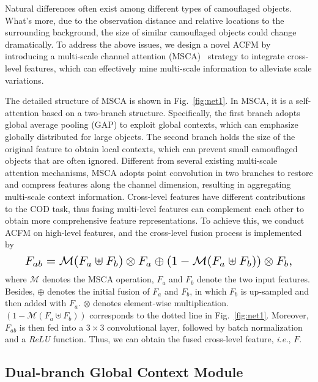 \documentclass[lettersize,journal]{IEEEtran}
\def\ie{\emph{i.e.}}
\begin{document}
Natural differences often exist among different types of camouflaged objects. What's more, due to the observation distance and relative locations to the surrounding background, the size of similar camouflaged objects could change dramatically. To address the above issues, we design a novel ACFM by introducing a multi-scale channel attention (MSCA)~\cite{aff} strategy to integrate cross-level features, which can effectively mine multi-scale information to alleviate scale variations.

The detailed structure of MSCA is shown in Fig.~\ref{fig:net1}. In MSCA, it is a self-attention based on a two-branch structure. Specifically, the first branch adopts global average pooling (GAP) to exploit global contexts, which can emphasize globally distributed for large objects. The second branch holds the size of the original feature to obtain local contexts, which can prevent small camouflaged objects that are often ignored. Different from several existing multi-scale attention mechanisms, MSCA adopts point convolution in two branches to restore and compress features along the channel dimension, resulting in aggregating multi-scale context information. Cross-level features have different contributions to the COD task, thus fusing multi-level features can complement each other to obtain more comprehensive feature representations. To achieve this, we conduct ACFM on high-level features, and the cross-level fusion process is implemented by
\begin{equation}
\resizebox{.91\linewidth}{!}{$
	\displaystyle
	F_{ab}=\mathcal{M}(F_{a}\uplus F_{b})\otimes F_{a}\oplus(1-\mathcal{M}(F_{a}\uplus F_{b}))\otimes F_{b},
	$}
\end{equation}%
where $\mathcal{M}$ denotes the MSCA operation, $F_{a}$ and $F_{b}$ denote the two input features. Besides, $\oplus$ denotes the initial fusion of $F_{a}$ and $F_{b}$, in which $F_{b}$ is up-sampled and then added with $F_{a}$. $\otimes$ denotes element-wise multiplication. $(1-\mathcal{M}(F_{a}\uplus F_{b}))$ corresponds to the {dotted line} in Fig.~\ref{fig:net1}. Moreover, $F_{ab}$ is then fed into a $3\times{3}$ convolutional layer, followed by batch normalization and a \emph{ReLU} function. Thus, we can obtain the fused cross-level feature, \ie, $F$.

\subsection{Dual-branch Global Context Module}
\end{document}
